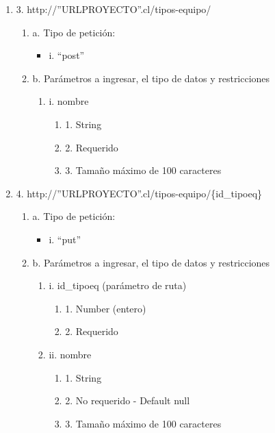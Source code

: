 \begin{enumerate}
    \item 3. http://”URLPROYECTO”.cl/tipos-equipo/
    \begin{enumerate}
        \item a. Tipo de petición:
            \begin{itemize}
               \item i. “post”
            \end{itemize}
        \item b. Parámetros a ingresar, el tipo de datos y restricciones
            \begin{enumerate}
                \item i. nombre
                    \begin{enumerate}
                        \item 1. String
                        \item 2. Requerido
                        \item 3. Tamaño máximo de 100 caracteres
                    \end{enumerate}
            \end{enumerate}
    \end{enumerate}

    \item 4. http://”URLPROYECTO”.cl/tipos-equipo/\{id\_tipoeq\}
    \begin{enumerate}
        \item a. Tipo de petición:
            \begin{itemize}
               \item i. “put”
            \end{itemize}
        \item b. Parámetros a ingresar, el tipo de datos y restricciones
            \begin{enumerate}
                \item i. id\_tipoeq (parámetro de ruta)
                    \begin{enumerate}
                        \item 1. Number (entero)
                        \item 2. Requerido
                    \end{enumerate}
                \item ii. nombre
                    \begin{enumerate}
                        \item 1. String
                        \item 2. No requerido - Default null
                        \item 3. Tamaño máximo de 100 caracteres
                    \end{enumerate}
            \end{enumerate}
    \end{enumerate}


\end{enumerate}
